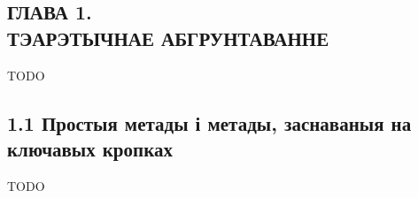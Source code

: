 \begin{center}
    \section*{ГЛАВА 1. \\ ТЭАРЭТЫЧНАЕ АБГРУНТАВАННЕ}
\end{center}

TODO

\subsection*{1.1 Простыя метады і метады, заснаваныя на ключавых кропках}

TODO

\newpage
